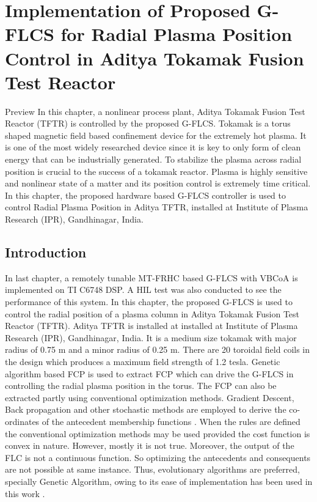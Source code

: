 \chapter{Implementation of Proposed G-FLCS for Radial Plasma Position Control in Aditya Tokamak Fusion Test Reactor}
\begin{chapterAbstract}{Preview}
	In this chapter, a nonlinear process plant, Aditya Tokamak Fusion Test Reactor (TFTR) is controlled by the proposed G-FLCS. Tokamak is a torus shaped magnetic field based confinement device for the extremely hot plasma. It is one of the most widely researched device since it is key to only form of clean energy that can be industrially generated. To stabilize the plasma across radial position is crucial to the success of a tokamak reactor. Plasma is highly sensitive and nonlinear state of a matter and its position control is extremely time critical. In this chapter, the proposed hardware based G-FLCS controller is used to control Radial Plasma Position in Aditya TFTR, installed at Institute of Plasma Research (IPR), Gandhinagar, India.
\end{chapterAbstract}
\clearpage

\section{Introduction}
In last chapter, a remotely tunable MT-FRHC based G-FLCS with VBCoA is implemented on TI C6748 DSP. A HIL test was also conducted to see the performance of this system. In this chapter, the proposed G-FLCS is used to control the radial position of a plasma column in Aditya Tokamak Fusion Test Reactor (TFTR). Aditya TFTR is installed at installed at Institute of Plasma Research (IPR), Gandhinagar, India. It is a medium size tokamak with major radius of 0.75 m and a minor radius of 0.25 m. There are 20 toroidal field coils in the design which produces a maximum field strength of 1.2 tesla. Genetic algorithm based FCP is used to extract FCP which can drive the G-FLCS in controlling the radial plasma position in the torus. The FCP can also be extracted partly using conventional optimization methods. Gradient Descent, Back propagation and other stochastic methods are employed to derive the co-ordinates of the antecedent membership functions \cite{Nguyen1996,Nguyen2003,Nguyen2015}. When the rules are defined the conventional optimization methods may be used provided the cost function is convex in nature. However, mostly it is not true. Moreover, the output of the FLC is not a continuous function. So optimizing the antecedents and consequents are not possible at same instance. Thus, evolutionary algorithms are preferred, specially Genetic Algorithm, owing to its ease of implementation has been used in this work \cite{Bandyopadhyay2001a,Surmann2001,Jajulwar200919}.
 
